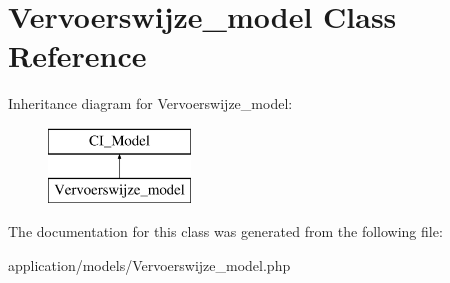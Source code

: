 \hypertarget{class_vervoerswijze__model}{}\section{Vervoerswijze\+\_\+model Class Reference}
\label{class_vervoerswijze__model}
Inheritance diagram for Vervoerswijze\+\_\+model\+:\begin{figure}[H]
\begin{center}
\leavevmode
\includegraphics[height=2.000000cm]{class_vervoerswijze__model}
\end{center}
\end{figure}


The documentation for this class was generated from the following file\+:\begin{DoxyCompactItemize}
\item 
application/models/Vervoerswijze\+\_\+model.\+php\end{DoxyCompactItemize}
